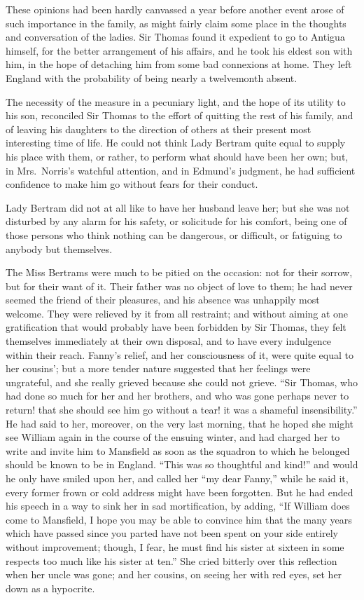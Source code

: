 These opinions had been hardly canvassed a year before
another event arose of such importance in the family,
as might fairly claim some place in the thoughts and
conversation of the ladies.  Sir Thomas found it expedient
to go to Antigua himself, for the better arrangement
of his affairs, and he took his eldest son with him,
in the hope of detaching him from some bad connexions
at home.  They left England with the probability of being
nearly a twelvemonth absent.

The necessity of the measure in a pecuniary light,
and the hope of its utility to his son, reconciled Sir
Thomas to the effort of quitting the rest of his family,
and of leaving his daughters to the direction of others
at their present most interesting time of life.
He could not think Lady Bertram quite equal to supply his
place with them, or rather, to perform what should have
been her own; but, in Mrs.\ Norris's watchful attention,
and in Edmund's judgment, he had sufficient confidence
to make him go without fears for their conduct.

Lady Bertram did not at all like to have her husband leave her;
but she was not disturbed by any alarm for his safety,
or solicitude for his comfort, being one of those persons
who think nothing can be dangerous, or difficult,
or fatiguing to anybody but themselves.

The Miss Bertrams were much to be pitied on the occasion:
not for their sorrow, but for their want of it.
Their father was no object of love to them; he had never
seemed the friend of their pleasures, and his absence
was unhappily most welcome.  They were relieved by it from
all restraint; and without aiming at one gratification
that would probably have been forbidden by Sir Thomas,
they felt themselves immediately at their own disposal,
and to have every indulgence within their reach.
Fanny's relief, and her consciousness of it, were quite
equal to her cousins'; but a more tender nature suggested
that her feelings were ungrateful, and she really
grieved because she could not grieve.  ``Sir Thomas,
who had done so much for her and her brothers, and who was
gone perhaps never to return! that she should see him
go without a tear! it was a shameful insensibility.''
He had said to her, moreover, on the very last morning,
that he hoped she might see William again in the course
of the ensuing winter, and had charged her to write
and invite him to Mansfield as soon as the squadron
to which he belonged should be known to be in England.
``This was so thoughtful and kind!'' and would he only
have smiled upon her, and called her ``my dear Fanny,''
while he said it, every former frown or cold address
might have been forgotten.  But he had ended his speech
in a way to sink her in sad mortification, by adding,
``If William does come to Mansfield, I hope you may be able
to convince him that the many years which have passed
since you parted have not been spent on your side entirely
without improvement; though, I fear, he must find his sister
at sixteen in some respects too much like his sister at ten.''
She cried bitterly over this reflection when her uncle
was gone; and her cousins, on seeing her with red eyes,
set her down as a hypocrite.



